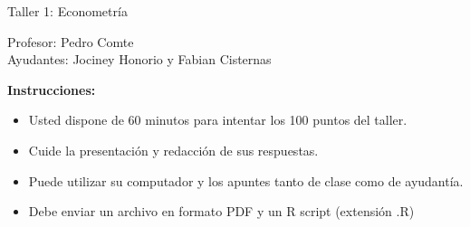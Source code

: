 \documentclass[letterpaper,11pt]{article}
\begin{document}
\begin{center}
    {\Large  Taller 1: Econometría }

Profesor:    Pedro Comte\\
Ayudantes: Jociney Honorio y Fabian Cisternas

\end{center}

\textbf{Instrucciones:} 

\begin{itemize}
    \item Usted dispone de 60 minutos  para intentar los 100 puntos del taller.
    \item Cuide la presentación y redacción de sus respuestas.
    \item Puede utilizar su computador y los apuntes tanto de clase como de ayudantía.
    \item Debe enviar un archivo en formato PDF y un R script (extensión .R)
\end{itemize}
\end{document}
